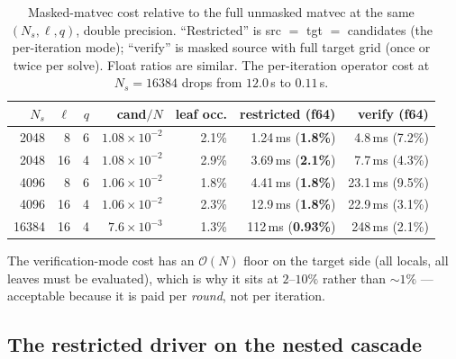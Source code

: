 \documentclass[11pt,a4paper]{article}
\newcommand{\Order}{\mathcal{O}}
\theoremstyle{definition}
\theoremstyle{remark}
\begin{document}
\begin{table}[h]
\centering
\begin{tabular}{rrrrrrr}
\toprule
$N_s$ & $\ell$ & $q$ & cand$/N$ & leaf occ. & restricted (f64) & verify (f64) \\
\midrule
2048  & 8  & 6 & $1.08\times10^{-2}$ & 2.1\% & 1.24\,ms (\textbf{1.8\%}) & 4.8\,ms (7.2\%) \\
2048  & 16 & 4 & $1.08\times10^{-2}$ & 2.9\% & 3.69\,ms (\textbf{2.1\%}) & 7.7\,ms (4.3\%) \\
4096  & 8  & 6 & $1.06\times10^{-2}$ & 1.8\% & 4.41\,ms (\textbf{1.8\%}) & 23.1\,ms (9.5\%) \\
4096  & 16 & 4 & $1.06\times10^{-2}$ & 2.3\% & 12.9\,ms (\textbf{1.8\%}) & 22.9\,ms (3.1\%) \\
16384 & 16 & 4 & $7.6\times10^{-3}$  & 1.3\% & 112\,ms (\textbf{0.93\%}) & 248\,ms (2.1\%) \\
\bottomrule
\end{tabular}
\caption{Masked-matvec cost relative to the full unmasked matvec at the same
$(N_s,\ell,q)$, double precision. ``Restricted'' is src $=$ tgt $=$
candidates (the per-iteration mode); ``verify'' is masked source with full
target grid (once or twice per solve). Float ratios are similar. The
per-iteration operator cost at $N_s=16384$ drops from $12.0$\,s to
$0.11$\,s.}
\label{tab:masked-gate}
\end{table}

The verification-mode cost has an $\Order(N)$ floor on the target side
(all locals, all leaves must be evaluated), which is why it sits at
$2$--$10\%$ rather than ${\sim}1\%$ --- acceptable because it is paid per
\emph{round}, not per iteration.

\subsection{The restricted driver on the nested cascade}
\label{sec:active-driver}
\end{document}
